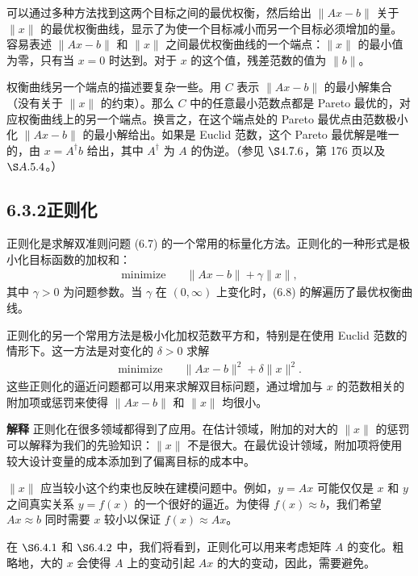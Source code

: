 \documentclass[UTF8,12pt,a4paper,fontset=fandol]{ctexart}
\begin{document}
可以通过多种方法找到这两个目标之间的最优权衡，然后给出 $\|Ax-b\|$ 关于 $\|x\|$ 的最优权衡曲线，显示了为使一个目标减小而另一个目标必须增加的量。容易表述 $\|Ax-b\|$ 和 $\|x\|$ 之间最优权衡曲线的一个端点：$\|x\|$ 的最小值为零，只有当 $x=0$ 时达到。对于 $x$ 的这个值，残差范数的值为 $\|b\|$。

权衡曲线另一个端点的描述要复杂一些。用 $C$ 表示 $\|Ax-b\|$ 的最小解集合（没有关于 $\|x\|$ 的约束）。那么 $C$ 中的任意最小范数点都是 Pareto 最优的，对应权衡曲线上的另一个端点。换言之，在这个端点处的 Pareto 最优点由范数极小化 $\|Ax-b\|$ 的最小解给出。如果是 Euclid 范数，这个 Pareto 最优解是唯一的，由 $x=A^\dagger b$ 给出，其中 $A^\dagger$ 为 $A$ 的伪逆。（参见 $\S 4.7.6$，第 176 页以及 $\S A.5.4$。）

\subsection*{6.3.2\quad 正则化}

正则化是求解双准则问题 (6.7) 的一个常用的标量化方法。正则化的一种形式是极小化目标函数的加权和：
\begin{equation}
\begin{aligned}
\text{minimize}\quad & \|Ax-b\|+\gamma\|x\|,
\end{aligned}
\tag{6.8}
\end{equation}
其中 $\gamma>0$ 为问题参数。当 $\gamma$ 在 $(0,\infty)$ 上变化时，(6.8) 的解遍历了最优权衡曲线。

正则化的另一个常用方法是极小化加权范数平方和，特别是在使用 Euclid 范数的情形下。这一方法是对变化的 $\delta>0$ 求解
\begin{equation}
\begin{aligned}
\text{minimize}\quad & \|Ax-b\|^2+\delta\|x\|^2.
\end{aligned}
\tag{6.9}
\end{equation}
这些正则化的逼近问题都可以用来求解双目标问题，通过增加与 $x$ 的范数相关的附加项或惩罚来使得 $\|Ax-b\|$ 和 $\|x\|$ 均很小。

\noindent\textbf{解释}\quad
正则化在很多领域都得到了应用。在估计领域，附加的对大的 $\|x\|$ 的惩罚可以解释为我们的先验知识：$\|x\|$ 不是很大。在最优设计领域，附加项将使用较大设计变量的成本添加到了偏离目标的成本中。

$\|x\|$ 应当较小这个约束也反映在建模问题中。例如，$y=Ax$ 可能仅仅是 $x$ 和 $y$ 之间真实关系 $y=f(x)$ 的一个很好的逼近。为使得 $f(x)\approx b$，我们希望 $Ax\approx b$ 同时需要 $x$ 较小以保证 $f(x)\approx Ax$。

在 $\S 6.4.1$ 和 $\S 6.4.2$ 中，我们将看到，正则化可以用来考虑矩阵 $A$ 的变化。粗略地，大的 $x$ 会使得 $A$ 上的变动引起 $Ax$ 的大的变动，因此，需要避免。
\end{document}
